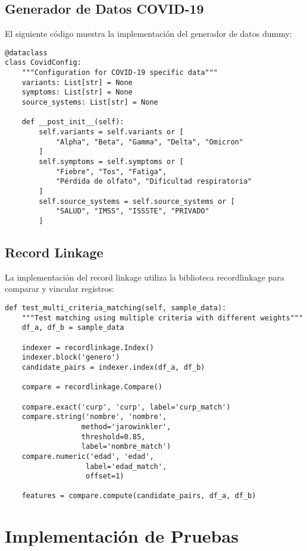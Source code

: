 \documentclass[12pt]{article}
\begin{document}
\subsection{Generador de Datos COVID-19}
El siguiente código muestra la implementación del generador de datos dummy:

\begin{lstlisting}[caption=Implementación del Generador de Datos COVID-19]
@dataclass
class CovidConfig:
    """Configuration for COVID-19 specific data"""
    variants: List[str] = None
    symptoms: List[str] = None
    source_systems: List[str] = None

    def __post_init__(self):
        self.variants = self.variants or [
            "Alpha", "Beta", "Gamma", "Delta", "Omicron"
        ]
        self.symptoms = self.symptoms or [
            "Fiebre", "Tos", "Fatiga", 
            "Pérdida de olfato", "Dificultad respiratoria"
        ]
        self.source_systems = self.source_systems or [
            "SALUD", "IMSS", "ISSSTE", "PRIVADO"
        ]
\end{lstlisting}

\subsection{Record Linkage}
La implementación del record linkage utiliza la biblioteca recordlinkage para 
comparar y vincular registros:

\begin{lstlisting}[caption=Implementación de Record Linkage]
def test_multi_criteria_matching(self, sample_data):
    """Test matching using multiple criteria with different weights"""
    df_a, df_b = sample_data
    
    indexer = recordlinkage.Index()
    indexer.block('genero')
    candidate_pairs = indexer.index(df_a, df_b)
    
    compare = recordlinkage.Compare()
    
    compare.exact('curp', 'curp', label='curp_match')
    compare.string('nombre', 'nombre', 
                  method='jarowinkler', 
                  threshold=0.85,
                  label='nombre_match')
    compare.numeric('edad', 'edad', 
                   label='edad_match',
                   offset=1)
    
    features = compare.compute(candidate_pairs, df_a, df_b)
\end{lstlisting}

\section{Implementación de Pruebas}
\end{document}
